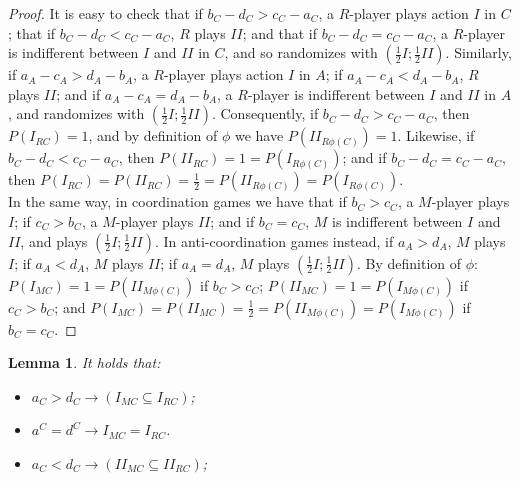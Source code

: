 \documentclass[fleqn,reqno,12pt]{article}
\theoremstyle{Satz}
\newtheorem{lemma}[theorem]{Lemma}
\theoremstyle{Bsp}
\begin{document}
\begin{proof}
  It is easy to check that if $b_{C}-d_{C}>c_{C}-a_{C}$, a $R$-player plays action $I$ in $C$;
  that if $b_{C}-d_{C}<c_{C}-a_{C}$, $R$ plays $II$; and that if $b_{C}-d_{C}=c_{C}-a_{C}$, a
  $R$-player is indifferent between $I$ and $II$ in $C$, and so randomizes with
  $(\frac{1}{2}I;\frac{1}{2}II)$. Similarly, if $a_{A}-c_{A}>d_{A}-b_{A}$, a $R$-player plays
  action $I$ in $A$; if $a_{A}-c_{A}<d_{A}-b_{A}$, $R$ plays $II$; and if
  $a_{A}-c_{A}=d_{A}-b_{A}$, a $R$-player is indifferent between $I$ and $II$ in $A$, and
  randomizes with $(\frac{1}{2}I;\frac{1}{2}II)$. Consequently, if $b_{C}-d_{C}>c_{C}-a_{C}$,
  then $P(I_{RC})=1$, and by definition of $\phi$ we have $P(II_{R\phi(C)})=1$. Likewise, if
  $b_{C}-d_{C}<c_{C}-a_{C}$, then $P(II_{RC})=1=P(I_{R\phi(C)})$; and if
  $b_{C}-d_{C}=c_{C}-a_{C}$,
  then $P(I_{RC})=P(II_{RC})=\frac{1}{2}=P(II_{R\phi(C)})=P(I_{R\phi(C)})$. \\
  In the same way, in coordination games we have that if $b_{C}>c_{C}$, a $M$-player plays $I$;
  if $c_{C}>b_{C}$, a $M$-player plays $II$; and if $b_{C}=c_{C}$, $M$ is indifferent between
  $I$ and $II$, and plays $(\frac{1}{2}I;\frac{1}{2}II)$. In anti-coordination games instead,
  if $a_{A}>d_{A}$, $M$ plays $I$; if $a_{A}<d_{A}$, $M$ plays $II$; if $a_{A}=d_{A}$, $M$
  plays $(\frac{1}{2}I;\frac{1}{2}II)$.  By definition of $\phi$:
  $P(I_{MC})=1=P(II_{M\phi(C)})$ if $b_{C}>c_{C}$; $P(II_{MC})=1=P(I_{M\phi(C)})$ if
  $c_{C}>b_{C}$; and $P(I_{MC})=P(II_{MC})=\frac{1}{2}=P(II_{M\phi(C)})=P(I_{M\phi(C)})$ if
  $b_{C}=c_{C}$.
\end{proof}

\begin{lemma} \label{lemma:action implications}
It holds that:
  \begin{itemize}
  \item $a_{C}>d_{C}\rightarrow(I_{MC}\subseteq I_{RC})$;
  \item $a^{C}=d^{C}\rightarrow I_{MC}=I_{RC}$.
  \item $a_{C}<d_{C}\rightarrow(II_{MC}\subseteq II_{RC})$;
  \end{itemize}
\end{lemma}
\end{document}
